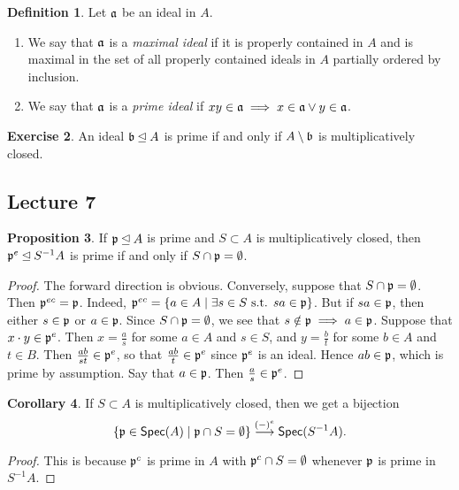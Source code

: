 \documentclass[10pt,letterpaper,cm]{nupset}
\theoremstyle{definition}
\newtheorem{definition}{Definition}[subsection]
\theoremstyle{theorem}
\newtheorem{prop}[definition]{Proposition}
\newtheorem{corollary}[definition]{Corollary}
\newtheorem{exercise}[definition]{Exercise}
\theoremstyle{remark}
\newcommand{\1}{\mathbf{1}}
\newcommand{\p}{\frak{p}}
\newcommand{\0}{\vec 0}
\begin{document}
\medskip


\begin{definition} Let $\frak{a}$ be an ideal in $A$.
\begin{enumerate}
\item We say that $\frak{a}$ is a \textit{maximal ideal} if it is properly contained in $A$ and is maximal in the set of   all properly contained ideals in $A$ partially ordered by inclusion.
\item We say that $\frak{a}$ is a \textit{prime ideal} if $xy\in \frak{a} \implies x \in \frak{a} \vee y \in \frak{a}$.
\end{enumerate}
\end{definition}

\begin{exercise}
An ideal $\frak{b} \unlhd A$ is prime if and only if $A \setminus \frak{b}$ is multiplicatively closed. 
\end{exercise}

\subsection{Lecture 7}

\begin{prop}  If $\frak{p} \unlhd A$ is prime and $ S\subset A$ is multiplicatively closed, then $\frak{p}^e \unlhd S^{-1}A$ is prime if and only if $S \cap \frak{p} = \emptyset$. 
\end{prop}
\begin{proof}
The forward direction is obvious. Conversely, suppose that $S \cap \frak{p} = \emptyset$. Then $\p^{ec} = \p$. Indeed, $\p^{ec} = \left\{a\in A\mid \exists s \in S \text{ s.t. } sa \in \p \right\}$. But if $sa\in \p$, then either $s\in \p$ or $a\in \p$. Since $S \cap \p = \emptyset$, we see that $s\notin \p \implies a\in \p$. Suppose that $x\cdot y\in \p^e$. Then $x= \frac{a}{s}$ for some $a\in A$ and $s\in S$, and $y = \frac{b}{t}$ for some $b\in A$ and $t\in B$.  Then $\frac{ab}{st}\in \p^e$, so that $\frac{ab}{t} \in \p^e$ since $\p^e$ is an ideal. Hence $ab \in \p$, which is prime by assumption. Say that $a\in \p$. Then $\frac{a}{s} \in \p^e$. 
\end{proof}

\begin{corollary} If $S \subset A$ is multiplicatively closed, then we get a bijection $$\{ \p \in \mathsf{Spec}(A) \mid \p \cap S=\emptyset\} \overset{(-)^e}{\longrightarrow}\mathsf{Spec}(S^{-1}A).$$  
\end{corollary}
\begin{proof}
This is because $\p^c$ is prime in $A$ with $\p^c \cap S = \emptyset$ whenever $\p$ is prime in $S^{-1}A$.
\end{proof}
\end{document}
